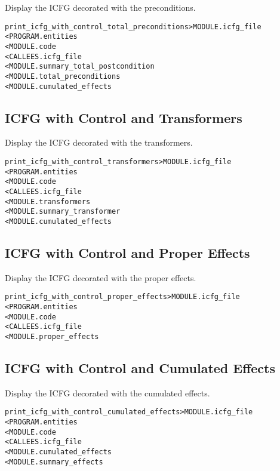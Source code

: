 \documentclass[a4paper]{report}
\newenvironment{PipsMake}{\begin{alltt}}{\end{alltt}}
\newenvironment{PipsPass}[1]{\label{pass:#1}}{}
\begin{document}
\begin{PipsPass}{print_icfg_with_control_total_preconditions}
Display the ICFG decorated with the preconditions.
\end{PipsPass}
\begin{PipsMake}
print_icfg_with_control_total_preconditions   > MODULE.icfg_file
        < PROGRAM.entities
        < MODULE.code
        < CALLEES.icfg_file
        < MODULE.summary_total_postcondition
        < MODULE.total_preconditions
        < MODULE.cumulated_effects
\end{PipsMake}

\subsection{ICFG with Control and Transformers}

\begin{PipsPass}{print_icfg_with_control_transformers}
Display the ICFG decorated with the transformers.
\end{PipsPass}
\begin{PipsMake}
print_icfg_with_control_transformers    > MODULE.icfg_file
        < PROGRAM.entities
        < MODULE.code
        < CALLEES.icfg_file
        < MODULE.transformers
        < MODULE.summary_transformer
        < MODULE.cumulated_effects
\end{PipsMake}

\subsection{ICFG with Control and Proper Effects}

\begin{PipsPass}{print_icfg_with_control_proper_effects}
Display the ICFG decorated with the proper effects.
\end{PipsPass}
\begin{PipsMake}
print_icfg_with_control_proper_effects  > MODULE.icfg_file
        < PROGRAM.entities
        < MODULE.code
        < CALLEES.icfg_file
        < MODULE.proper_effects
\end{PipsMake}

\subsection{ICFG with Control and Cumulated Effects}

\begin{PipsPass}{print_icfg_with_control_cumulated_effects}
Display the ICFG decorated with the cumulated effects.
\end{PipsPass}
\begin{PipsMake}
print_icfg_with_control_cumulated_effects   > MODULE.icfg_file
        < PROGRAM.entities
        < MODULE.code
        < CALLEES.icfg_file
        < MODULE.cumulated_effects
        < MODULE.summary_effects
\end{PipsMake}
\end{document}
